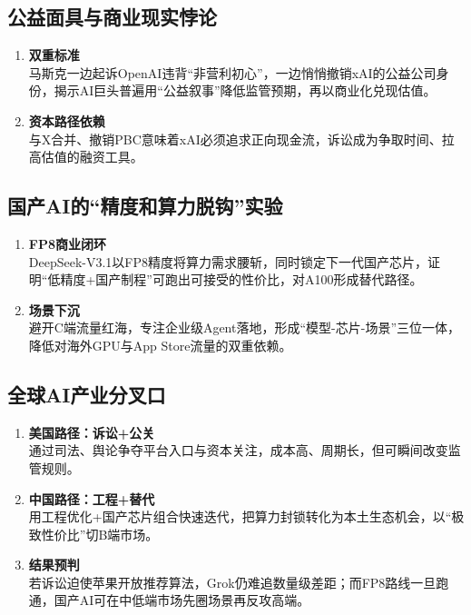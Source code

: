 \subsection{公益面具与商业现实悖论}
\begin{enumerate}[leftmargin=*, nosep]
    \item \textbf{双重标准}  \\
    马斯克一边起诉OpenAI违背“非营利初心”，一边悄悄撤销xAI的公益公司身份，揭示AI巨头普遍用“公益叙事”降低监管预期，再以商业化兑现估值。
    \item \textbf{资本路径依赖}  \\
    与X合并、撤销PBC意味着xAI必须追求正向现金流，诉讼成为争取时间、拉高估值的融资工具。
\end{enumerate}

\subsection{国产AI的“精度和算力脱钩”实验}
\begin{enumerate}[leftmargin=*, nosep]
    \item \textbf{FP8商业闭环}  \\
    DeepSeek-V3.1以FP8精度将算力需求腰斩，同时锁定下一代国产芯片，证明“低精度+国产制程”可跑出可接受的性价比，对A100形成替代路径。
    \item \textbf{场景下沉}  \\
    避开C端流量红海，专注企业级Agent落地，形成“模型-芯片-场景”三位一体，降低对海外GPU与App Store流量的双重依赖。
\end{enumerate}

\subsection{全球AI产业分叉口}
\begin{enumerate}[leftmargin=*, nosep]
    \item \textbf{美国路径：诉讼+公关}  \\
    通过司法、舆论争夺平台入口与资本关注，成本高、周期长，但可瞬间改变监管规则。
    \item \textbf{中国路径：工程+替代}  \\
    用工程优化+国产芯片组合快速迭代，把算力封锁转化为本土生态机会，以“极致性价比”切B端市场。
    \item \textbf{结果预判}  \\
    若诉讼迫使苹果开放推荐算法，Grok仍难追数量级差距；而FP8路线一旦跑通，国产AI可在中低端市场先圈场景再反攻高端。
\end{enumerate}

